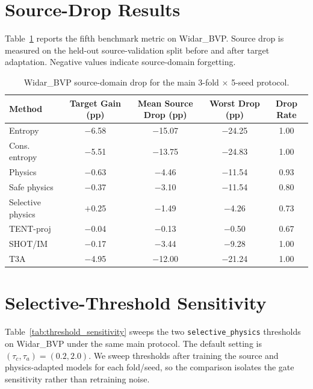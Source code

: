 \section{Source-Drop Results}
\label{app:source_drop}

Table~\ref{tab:source_drop_full} reports the fifth benchmark metric on
Widar\_BVP. Source drop is measured on the held-out source-validation split
before and after target adaptation. Negative values indicate source-domain
forgetting.

\begin{table}[h]
\centering
\small
\begin{tabular}{lcccc}
\toprule
\textbf{Method} & \textbf{Target Gain (pp)} & \textbf{Mean Source Drop (pp)} & \textbf{Worst Drop (pp)} & \textbf{Drop Rate} \\
\midrule
Entropy & $-$6.58 & $-$15.07 & $-$24.25 & 1.00 \\
Cons. entropy & $-$5.51 & $-$13.75 & $-$24.83 & 1.00 \\
Physics & $-$0.63 & $-$4.46 & $-$11.54 & 0.93 \\
Safe physics & $-$0.37 & $-$3.10 & $-$11.54 & 0.80 \\
Selective physics & $+$0.25 & $-$1.49 & $-$4.26 & 0.73 \\
TENT-proj & $-$0.04 & $-$0.13 & $-$0.50 & 0.67 \\
SHOT/IM & $-$0.17 & $-$3.44 & $-$9.28 & 1.00 \\
T3A & $-$4.95 & $-$12.00 & $-$21.24 & 1.00 \\
\bottomrule
\end{tabular}
\caption{Widar\_BVP source-domain drop for the main 3-fold $\times$ 5-seed protocol.}
\label{tab:source_drop_full}
\end{table}

\section{Selective-Threshold Sensitivity}
\label{app:threshold_sensitivity}

Table~\ref{tab:threshold_sensitivity} sweeps the two
\texttt{selective\_physics} thresholds on Widar\_BVP under the same main
protocol. The default setting is $(\tau_c,\tau_a)=(0.2,2.0)$. We sweep thresholds
after training the source and physics-adapted models for each fold/seed, so the
comparison isolates the gate sensitivity rather than retraining noise.


